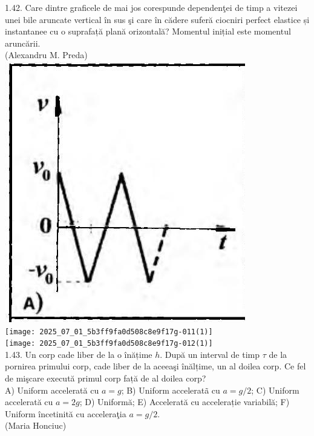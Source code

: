 \documentclass[10pt]{article}
\begin{document}
1.42. Care dintre graficele de mai jos corespunde dependenţei de timp a vitezei unei bile aruncate vertical în sus şi care în cădere suferă ciocniri perfect elastice și instantanee cu o suprafață plană orizontală? Momentul inițial este momentul aruncării.\\ (Alexandru M. Preda)\\ \includegraphics[max width=\textwidth, center]{2025_07_01_5b3ff9fa0d508c8e9f17g-011}\\ \texttt{[image: 2025\_07\_01\_5b3ff9fa0d508c8e9f17g-011(1)]}\\ \texttt{[image: 2025\_07\_01\_5b3ff9fa0d508c8e9f17g-012(1)]}\\

1.43. Un corp cade liber de la o înățime $h$. După un interval de timp $\tau$ de la pornirea primului corp, cade liber de la aceeaşi înălțime, un al doilea corp. Ce fel de mişcare execută primul corp față de al doilea corp?\\ A) Uniform accelerată cu $a=g$; B) Uniform acceleratã cu $a=g / 2$; C) Uniform accelerată cu $a=2 g$; D) Uniformă; E) Accelerată cu accelerație variabilă; F) Uniform încetinită cu acceleraţia $a=g / 2$.\\ (Maria Honciuc)\\
\end{document}
